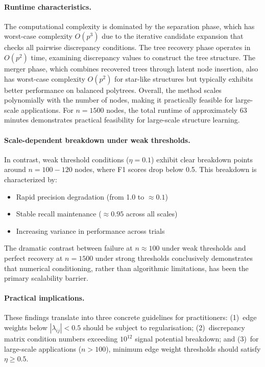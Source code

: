 \documentclass[11pt,a4paper]{article}
\numberwithin{equation}{section}
\begin{document}
\paragraph{Runtime characteristics.} The computational complexity is dominated by the separation phase, which has worst-case complexity $O(p^3)$ due to the iterative candidate expansion that checks all pairwise discrepancy conditions. The tree recovery phase operates in $O(p^2)$ time, examining discrepancy values to construct the tree structure. The merger phase, which combines recovered trees through latent node insertion, also has worst-case complexity $O(p^2)$ for star-like structures but typically exhibits better performance on balanced polytrees. Overall, the method scales polynomially with the number of nodes, making it practically feasible for large-scale applications. For $n = 1500$ nodes, the total runtime of approximately 63 minutes demonstrates practical feasibility for large-scale structure learning.

\paragraph{Scale-dependent breakdown under weak thresholds.} In contrast, weak threshold conditions ($\eta = 0.1$) exhibit clear breakdown points around $n = 100-120$ nodes, where F1 scores drop below 0.5. This breakdown is characterized by:
\begin{itemize}
\item Rapid precision degradation (from 1.0 to $\approx 0.1$)
\item Stable recall maintenance ($\approx 0.95$ across all scales)
\item Increasing variance in performance across trials
\end{itemize}

The dramatic contrast between failure at $n \approx 100$ under weak thresholds and perfect recovery at $n = 1500$ under strong thresholds conclusively demonstrates that numerical conditioning, rather than algorithmic limitations, has been the primary scalability barrier.

\paragraph{Practical implications.}
These findings translate into three concrete guidelines for practitioners:
(1)~edge weights below $|\lambda_{ij}|<0.5$ should be subject to regularisation;
(2)~discrepancy matrix condition numbers exceeding $10^{12}$ signal potential
breakdown; and (3)~for large-scale applications ($n>100$), minimum edge weight
thresholds should satisfy $\eta\geq0.5$.
\end{document}
